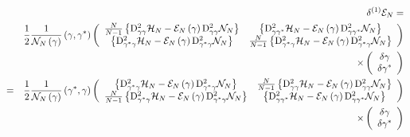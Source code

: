 \documentclass[aps,preprint]{revtex4}
\begin{document}
\begin{eqnarray}
&&\delta ^{\left( 1\right) }\mathcal{E}_{N}=  \nonumber \\
&&\frac{1}{2}\frac{1}{\mathcal{N}_{N}\left( \mathbf{\gamma }\right) }\left( 
\mathbf{\gamma ,\gamma }^{\ast }\right) \left( 
\begin{array}{cc}
\frac{N}{N-1}\left\{ \mathrm{D}_{\gamma \gamma }^{2}\mathcal{H}_{N}-\mathcal{%
E}_{N}\left( \mathbf{\gamma }\right) \mathrm{D}_{\gamma \gamma }^{2}\mathcal{%
N}_{N}\right\} & \left\{ \mathrm{D}_{\gamma \gamma ^{\ast }}^{2}\mathcal{H}%
_{N}-\mathcal{E}_{N}\left( \mathbf{\gamma }\right) \mathrm{D}_{\gamma \gamma
^{\ast }}^{2}\mathcal{N}_{N}\right\} \\ 
\left\{ \mathrm{D}_{\gamma ^{\ast }\gamma }^{2}\mathcal{H}_{N}-\mathcal{E}%
_{N}\left( \mathbf{\gamma }\right) \mathrm{D}_{\gamma ^{\ast }\gamma }^{2}%
\mathcal{N}_{N}\right\} & \frac{N}{N-1}\left\{ \mathrm{D}_{\gamma ^{\ast
}\gamma }^{2}\mathcal{H}_{N}-\mathcal{E}_{N}\left( \mathbf{\gamma }\right) 
\mathrm{D}_{\gamma ^{\ast }\gamma }^{2}\mathcal{N}_{N}\right\}%
\end{array}%
\right)  \nonumber \\
&&\qquad \qquad \qquad \qquad \qquad \qquad \qquad \qquad \qquad \qquad
\qquad \qquad \qquad \qquad \qquad \qquad \qquad \times \left( 
\begin{array}{c}
\delta \mathbf{\gamma } \\ 
\delta \mathbf{\gamma }^{\ast }%
\end{array}%
\right) \\
&=&\frac{1}{2}\frac{1}{\mathcal{N}_{N}\left( \mathbf{\gamma }\right) }\left( 
\mathbf{\gamma }^{\ast }\mathbf{,\gamma }\right) \left( 
\begin{array}{cc}
\left\{ \mathrm{D}_{\gamma ^{\ast }\gamma }^{2}\mathcal{H}_{N}-\mathcal{E}%
_{N}\left( \mathbf{\gamma }\right) \mathrm{D}_{\gamma ^{\ast }\gamma }^{2}%
\mathcal{N}_{N}\right\} & \frac{N}{N-1}\left\{ \mathrm{D}_{\gamma \gamma
}^{2}\mathcal{H}_{N}-\mathcal{E}_{N}\left( \mathbf{\gamma }\right) \mathrm{D}%
_{\gamma \gamma }^{2}\mathcal{N}_{N}\right\} \\ 
\frac{N}{N-1}\left\{ \mathrm{D}_{\gamma ^{\ast }\gamma }^{2}\mathcal{H}_{N}-%
\mathcal{E}_{N}\left( \mathbf{\gamma }\right) \mathrm{D}_{\gamma ^{\ast
}\gamma }^{2}\mathcal{N}_{N}\right\} & \left\{ \mathrm{D}_{\gamma \gamma
^{\ast }}^{2}\mathcal{H}_{N}-\mathcal{E}_{N}\left( \mathbf{\gamma }\right) 
\mathrm{D}_{\gamma \gamma ^{\ast }}^{2}\mathcal{N}_{N}\right\}%
\end{array}%
\right)  \nonumber \\
&&\qquad \qquad \qquad \qquad \qquad \qquad \qquad \qquad \qquad \qquad
\qquad \qquad \qquad \qquad \qquad \qquad \qquad \times \left( 
\begin{array}{c}
\delta \mathbf{\gamma } \\ 
\delta \mathbf{\gamma }^{\ast }%
\end{array}%
\right)
\end{eqnarray}%
\end{document}
